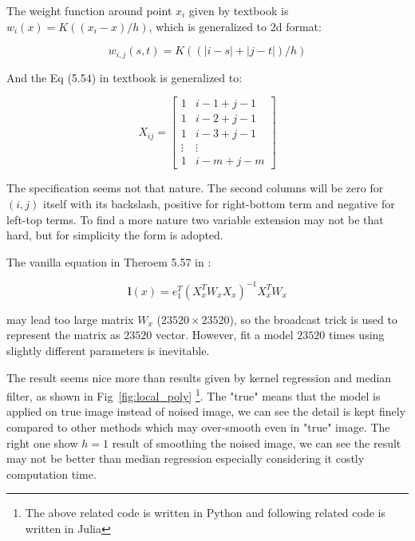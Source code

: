 \documentclass{article}
\begin{document}
The weight function around point $x_i$ given by textbook \cite{wasserman2006all} is $w_i(x) = K((x_i - x)/h)$,
which is generalized to 2d format:

$$
w_{i,j}(s,t) = K((|i-s|+|j-t|)/h)
$$

And the Eq (5.54) in textbook \cite{wasserman2006all} is generalized to:

$$
X_{ij} = \begin{bmatrix}
  1 & i-1 + j-1 \\
  1 & i-2 + j-1 \\
  1 & i-3 + j-1 \\
  \vdots & \vdots \\
  1 & i-m + j-m
\end{bmatrix}
$$

The specification seems not that nature. 
The second columns will be zero for $(i,j)$ itself with its backslash, positive for right-bottom term 
and negative for left-top terms. To find a more nature two variable extension may not be that hard,
but for simplicity the form is adopted.

The vanilla equation in Theroem 5.57 in \cite{wasserman2006all}:

$$
\mathbf{l}(x) = e_1^T (X_x^T W_x X_x)^{-1} X_x^T W_x
$$

may lead too large matrix $W_x$ ($23520 \times 23520$), so the broadcast trick is used to represent the matrix as 
$23520$ vector. However, fit a model $23520$ times using slightly different parameters is inevitable. 

The result seems nice more than results given by kernel regression and median filter, 
as shown in Fig~\ref{fig:local_poly} 
\footnote{The above related code is written in Python and following related code is written in Julia}.  
The "true" means that the model is applied on true image instead of noised image,
we can see the detail is kept finely compared to other methods which may over-smooth even in "true" image.
The right one show $h=1$ result of smoothing the noised image, we can see the result may not be better than median regression especially considering
it costly computation time. 
\end{document}

